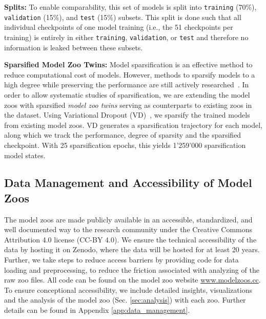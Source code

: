 \textbf{Splits:}
To enable comparability, this set of models is split into \texttt{training} (70\%), \texttt{validation} (15\%), and \texttt{test} (15\%) subsets. 
This split is done such that all individual checkpoints of one model training (i.e., the 51 checkpoints per training) 
is entirely in either \texttt{training}, \texttt{validation}, or \texttt{test} and therefore no information is leaked between these subsets.

\textbf{Sparsified Model Zoo Twins:}
Model sparsification is an effective method to reduce computational cost of models. 
However, methods to sparsify models to a high degree while preserving the performance are still actively researched~\citep{hoeflerSparsityDeepLearning2021}. 
In order to allow systematic studies of sparsification, we are extending the model zoos with sparsified \textit{model zoo twins} serving as counterparts to existing zoos in the dataset. Using Variational Dropout (VD)~\citep{molchanovVariationalDropoutSparsifies2017}, we sparsify the trained models from existing model zoos. VD generates a sparsification trajectory for each model, along which we track the performance, degree of sparsity and the sparsified checkpoint. With 25 sparsification epochs, this yields 1'259'000 sparsification model states.

%
%
%
%
%
%
%
\subsection{Data Management and Accessibility of Model Zoos}
\label{sec:data_management}
The model zoos are made publicly available in an accessible, standardized, and well documented way to the research community under the Creative Commons Attribution 4.0 license (CC-BY 4.0). 
We ensure the technical accessibility of the data by hosting it on Zenodo, where the data will be hosted for at least 20 years.
Further, we take steps to reduce access barriers by providing code for data loading and preprocessing, to reduce the friction associated with analyzing of the raw zoo files.
All code can be found on the model zoo website \href{www.modelzoos.cc}{www.modelzoos.cc}.
To ensure conceptional accessibility, we include detailed insights, visualizations and the analysis of the model zoo (Sec. \ref{sec:analysis}) with each zoo.
Further details can be found in Appendix \ref{app:data_management}. 
%

%
%
%
